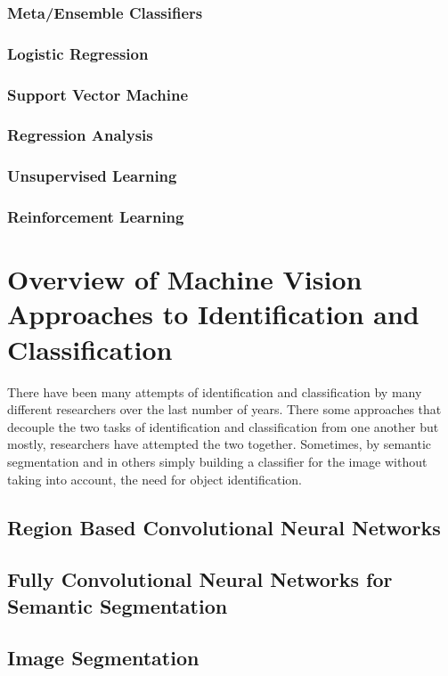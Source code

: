 \subsubsection{Meta/Ensemble Classifiers}
\subsubsection{Logistic Regression}
\subsubsection{Support Vector Machine}
\subsubsection{Regression Analysis}
\subsubsection{Unsupervised Learning}
\subsubsection{Reinforcement Learning}

\section{Overview of Machine Vision Approaches to Identification and Classification}
There have been many attempts of identification and classification by many
different researchers over the last number of years. There some approaches that
decouple the two tasks of identification and classification from one another but
mostly, researchers have attempted the two together. Sometimes, by semantic
segmentation and in others simply building a classifier for the image without
taking into account, the need for object identification.

\subsection{Region Based Convolutional Neural Networks}

\subsection{Fully Convolutional Neural Networks for Semantic Segmentation}

\subsection{Image Segmentation}

